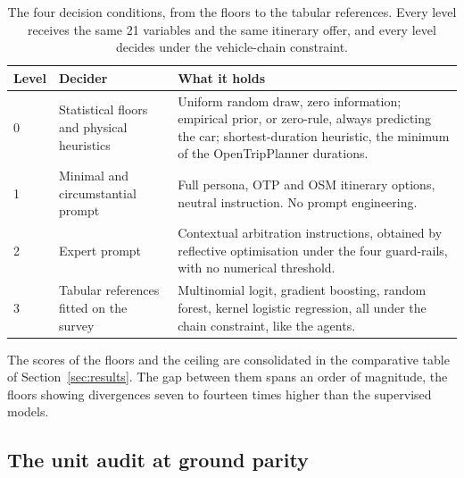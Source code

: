 \begin{table}[tp]
  \caption{The four decision conditions, from the floors to the tabular references. Every level receives the same 21 variables and the same itinerary offer, and every level decides under the vehicle-chain constraint.}
  \label{tab:levels}
  \begin{tabular}{llp{}}
    \toprule
    Level & Decider & What it holds \\
    \midrule
    0 & Statistical floors and physical heuristics & Uniform random draw, zero information; empirical prior, or zero-rule, always predicting the car; shortest-duration heuristic, the minimum of the OpenTripPlanner durations. \\
    1 & Minimal and circumstantial prompt          & Full persona, OTP and OSM itinerary options, neutral instruction. No prompt engineering. \\
    2 & Expert prompt                              & Contextual arbitration instructions, obtained by reflective optimisation under the four guard-rails, with no numerical threshold. \\
    3 & Tabular references fitted on the survey    & Multinomial logit, gradient boosting, random forest, kernel logistic regression, all under the chain constraint, like the agents. \\
    \bottomrule
  \end{tabular}
\end{table}

The scores of the floors and the ceiling are consolidated in the comparative table of Section~\ref{sec:results}. The gap between them spans an order of magnitude, the floors showing divergences seven to fourteen times higher than the supervised models.


\subsection{The unit audit at ground parity}
\label{sec:audit}

